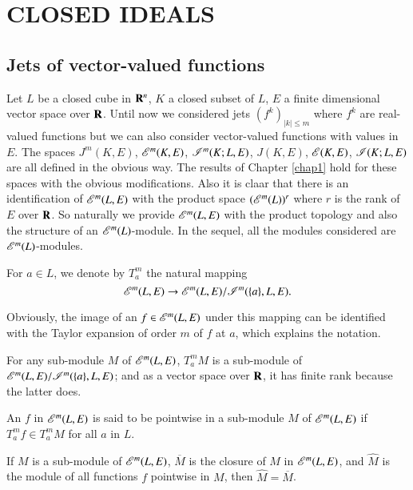 \chapter{CLOSED IDEALS}\label{chap2}
\pageoriginale

\section{Jets of vector-valued functions}\label{chap2-sec1}

Let $L$ be a closed cube in $\mathbf{R}^{n}$, $K$ a closed subset of $L$, $E$ a finite dimensional vector space over $\mathbf{R}$. Until now we considered jets $(f^{k})_{|k|\leq m}$ where $f^{k}$ are real-valued functions but we can also consider vector-valued functions with values in $E$. The spaces $J^{m}(K,E)$, $\mathscr{E}^{m}(K,E)$, $\mathscr{I}^{m}(K;L,E)$, $J(K,E)$, $\mathscr{E}(K,E)$, $\mathscr{I}(K;L,E)$ are all defined in the obvious way. The results of Chapter \ref{chap1} hold for these spaces with the obvious modifications. Also it is claar that there is an identification of $\mathscr{E}^{m}(L,E)$ with the product space $(\mathscr{E}^{m}(L))^{r}$ where $r$ is the rank of $E$ over $\mathbf{R}$. So naturally we provide $\mathscr{E}^{m}(L,E)$ with the product topology and also the structure of an $\mathscr{E}^{m}(L)$-module. In the sequel, all the modules considered are $\mathscr{E}^{m}(L)$-modules.

\begin{definition}\label{chap2-defi1.1}
For $a\in L$, we denote by $T^{m}_{a}$ the natural mapping
$$
\mathscr{E}^{m}(L,E)\to \mathscr{E}^{m}(L,E)/\mathscr{I}^{m}(\{a\},L,E).
$$

Obviously, the image of an $f\in \mathscr{E}^{m}(L,E)$ under this mapping can be identified with the Taylor expansion of order $m$ of $f$ at $a$, which explains the notation.

For any sub-module $M$ of $\mathscr{E}^{m}(L,E)$, $T^{m}_{a}M$ is a sub-module of $\mathscr{E}^{m}(L,E)/\mathscr{I}^{m}(\{a\},L,E)$; and as a vector space over $\mathbf{R}$, it has finite rank because the latter does.
\end{definition}

\begin{definition}\label{chap2-defi1.2}
An $f$ in $\mathscr{E}^{m}(L,E)$ is said to be pointwise in a sub-module $M$ of $\mathscr{E}^{m}(L,E)$ if $T^{m}_{a}f\in T^{m}_{a}M$ for all $a$ in $L$.
\end{definition}

\begin{theorem}\label{chap2-thm1.3}
If $M$ is a sub-module of $\mathscr{E}^{m}(L,E)$, $\overline{M}$ is the closure of $M$ in $\mathscr{E}^{m}(L,E)$, and $\widehat{M}$ is the module of all functions $f$ pointwise in $M$, then $\widehat{M}=\overline{M}$.
\end{theorem}

